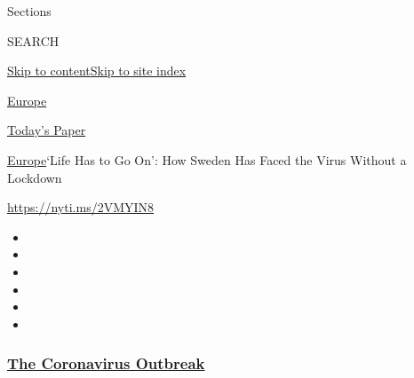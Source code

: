 Sections

SEARCH

\protect\hyperlink{site-content}{Skip to
content}\protect\hyperlink{site-index}{Skip to site index}

\href{https://www.nytimes3xbfgragh.onion/section/world/europe}{Europe}

\href{https://myaccount.nytimes3xbfgragh.onion/auth/login?response_type=cookie\&client_id=vi}{}

\href{https://www.nytimes3xbfgragh.onion/section/todayspaper}{Today's
Paper}

\href{/section/world/europe}{Europe}\textbar{}`Life Has to Go On': How
Sweden Has Faced the Virus Without a Lockdown

\url{https://nyti.ms/2VMYIN8}

\begin{itemize}
\item
\item
\item
\item
\item
\item
\end{itemize}

\hypertarget{the-coronavirus-outbreak}{%
\subsubsection{\texorpdfstring{\href{https://www.nytimes3xbfgragh.onion/news-event/coronavirus?name=styln-coronavirus-national\&region=TOP_BANNER\&block=storyline_menu_recirc\&action=click\&pgtype=Article\&impression_id=41cc07d0-f4c0-11ea-b745-fdde6a7fe5f7\&variant=undefined}{The
Coronavirus
Outbreak}}{The Coronavirus Outbreak}}\label{the-coronavirus-outbreak}}


